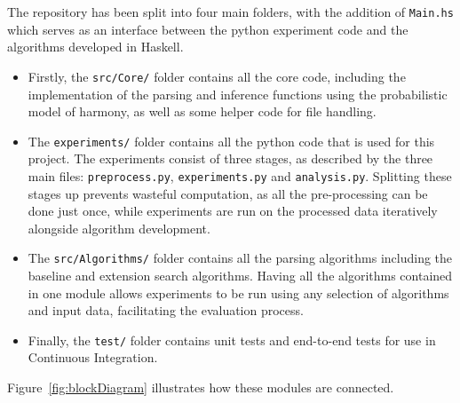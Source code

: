 \documentclass[12pt,a4paper,twoside,openany]{report} \usepackage[pdfborder={0 0 0}]{hyperref}    %
\theoremstyle{definition} \newtheorem{definition}{Definition}[section]
\begin{document}
    The repository has been split into four main folders, with the addition of \texttt{Main.hs} which serves as an interface
    between the python experiment code and the algorithms developed in Haskell. 
    \begin{itemize} 
      \item Firstly, the \texttt{src/Core/} folder contains all the core code, including the implementation of the parsing  and inference functions using the probabilistic model of harmony, as well as some helper code for file handling. 
      \item The
    \texttt{experiments/} folder contains all the python code that is used for this project. The experiments consist of
    three stages, as described by the three main files: \texttt{preprocess.py}, \texttt{experiments.py} and
    \texttt{analysis.py}. Splitting these stages up prevents wasteful computation, as all the pre-processing can be done
    just once, while experiments are run on the processed data iteratively alongside algorithm development. 
  \item The \texttt{src/Algorithms/} folder contains all the parsing algorithms including the baseline and extension search
    algorithms. Having all the algorithms contained in one module allows experiments to be run using any selection of
    algorithms and input data, facilitating the evaluation process.  
  \item Finally, the \texttt{test/} folder contains unit tests and end-to-end tests for use in Continuous Integration. 
    \end{itemize}

    Figure~\ref{fig:blockDiagram} illustrates how these modules are connected. 
\end{document}
